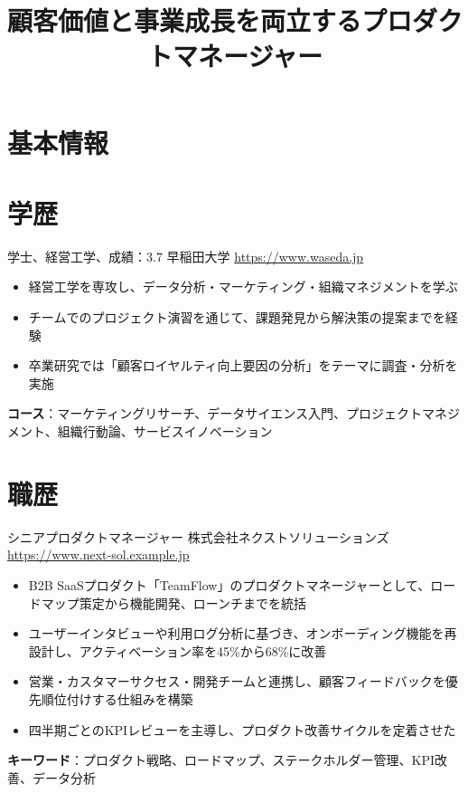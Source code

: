 \documentclass[a4paper, serif, 10pt]{moderncv}
\title{顧客価値と事業成長を両立するプロダクトマネージャー}
\begin{document}
\maketitle

\section{基本情報}

\section{学歴}

        {学士、経営工学、成績：3.7}
        {早稲田大学}
        {\url{https://www.waseda.jp}}
        {}
        {\begin{itemize}
\item 経営工学を専攻し、データ分析・マーケティング・組織マネジメントを学ぶ
\item チームでのプロジェクト演習を通じて、課題発見から解決策の提案までを経験
\item 卒業研究では「顧客ロイヤルティ向上要因の分析」をテーマに調査・分析を実施
\end{itemize}
\textbf{コース}：マーケティングリサーチ、データサイエンス入門、プロジェクトマネジメント、組織行動論、サービスイノベーション}
\section{職歴}

        {シニアプロダクトマネージャー}
        {株式会社ネクストソリューションズ}
        {\url{https://www.next-sol.example.jp}}
        {}
        {\begin{itemize}
\item B2B SaaSプロダクト「TeamFlow」のプロダクトマネージャーとして、ロードマップ策定から機能開発、ローンチまでを統括
\item ユーザーインタビューや利用ログ分析に基づき、オンボーディング機能を再設計し、アクティベーション率を45\%から68\%に改善
\item 営業・カスタマーサクセス・開発チームと連携し、顧客フィードバックを優先順位付けする仕組みを構築
\item 四半期ごとのKPIレビューを主導し、プロダクト改善サイクルを定着させた
\end{itemize}
\textbf{キーワード}：プロダクト戦略、ロードマップ、ステークホルダー管理、KPI改善、データ分析}
\end{document}
